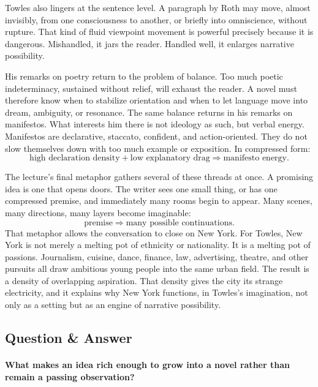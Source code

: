 Towles also lingers at the sentence level. A paragraph by Roth may move, almost invisibly, from one consciousness to another, or briefly into omniscience, without rupture. That kind of fluid viewpoint movement is powerful precisely because it is dangerous. Mishandled, it jars the reader. Handled well, it enlarges narrative possibility.

His remarks on poetry return to the problem of balance. Too much poetic indeterminacy, sustained without relief, will exhaust the reader. A novel must therefore know when to stabilize orientation and when to let language move into dream, ambiguity, or resonance. The same balance returns in his remarks on manifestos. What interests him there is not ideology as such, but verbal energy. Manifestos are declarative, staccato, confident, and action-oriented. They do not slow themselves down with too much example or exposition. In compressed form:
\begin{equation}
\text{high declaration density} + \text{low explanatory drag} \Rightarrow \text{manifesto energy}.
\end{equation}

The lecture's final metaphor gathers several of these threads at once. A promising idea is one that opens doors. The writer sees one small thing, or has one compressed premise, and immediately many rooms begin to appear. Many scenes, many directions, many layers become imaginable:
\begin{equation}
\text{premise} \Rightarrow \text{many possible continuations}.
\end{equation}
That metaphor allows the conversation to close on New York. For Towles, New York is not merely a melting pot of ethnicity or nationality. It is a melting pot of passions. Journalism, cuisine, dance, finance, law, advertising, theatre, and other pursuits all draw ambitious young people into the same urban field. The result is a density of overlapping aspiration. That density gives the city its strange electricity, and it explains why New York functions, in Towles's imagination, not only as a setting but as an engine of narrative possibility.

\subsection{Question \& Answer}

\paragraph{What makes an idea rich enough to grow into a novel rather than remain a passing observation?}

